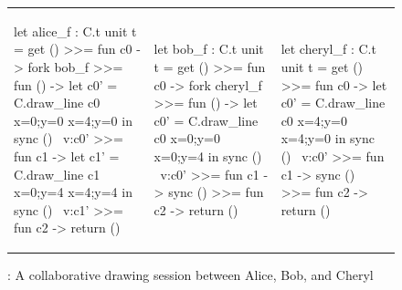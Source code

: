 \begin{figure}
\centering
\begin{tabular}{l||l||l}
\begin{ocaml}
let alice_f : C.t unit t = 
  get () >>= fun c0 -> 
  fork bob_f >>= fun () ->
  let c0' = C.draw_line c0 
    {x=0;y=0}
    {x=4;y=0} in
  sync () ~v:c0' >>= 
  fun c1 ->
  let c1' = C.draw_line c1 
    {x=0;y=4} 
    {x=4;y=4} in
  sync () ~v:c1' >>= 
  fun c2 -> return ()
\end{ocaml}
&
\begin{ocaml}
let bob_f : C.t unit t = 
  get () >>= fun c0 -> 
  fork cheryl_f >>= 
  fun () ->
  let c0' = C.draw_line c0 
    {x=0;y=0} 
    {x=0;y=4} in
  sync () ~v:c0' >>= 
  fun c1 -> sync () >>= 
  fun c2 -> return ()
\end{ocaml}
&
\begin{ocaml}
let cheryl_f : C.t unit t = 
  get () >>= fun c0 -> 
  let c0' = C.draw_line c0 
    {x=4;y=0} 
    {x=4;y=0} in
  sync () ~v:c0' >>= 
  fun c1 -> sync () >>= 
  fun c2 -> return ()
\end{ocaml}
\\
\end{tabular}
\caption{\drawsome: A collaborative drawing session between Alice,
Bob, and Cheryl}
\label{fig:canvas-sessions-code}
\end{figure}

